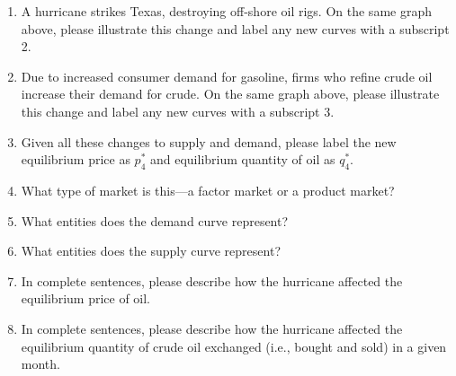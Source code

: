 \documentclass[
    letterpaper,paper=portrait,fleqn,
    DIV=16,fontsize=12pt,twoside=semi,
    parskip=full-,
    headings=standardclasses]
{scrartcl}
\begin{document}
\begin{enumerate}[resume]

\item A hurricane strikes Texas, destroying off-shore oil rigs. On the same graph above, please illustrate this change and label any new curves with a subscript 2.

\item Due to increased consumer demand for gasoline, firms who refine crude oil increase their demand for crude. On the same graph above, please illustrate this change and label any new curves with a subscript 3.

\item Given all these changes to supply and demand, please label the new equilibrium price as $p^*_4$
and equilibrium quantity of oil as $q^*_4$.

\item What type of market is this---a factor market or a product market?

\vfill

\vspace{-2\baselineskip}

\clearpage

\item What entities does the demand curve represent?

\vfill

\item What entities does the supply curve represent?

\vfill

\item In complete sentences, please describe how the hurricane affected the equilibrium price of oil.

\vfill

\item In complete sentences, please describe how the hurricane affected the equilibrium quantity of crude oil exchanged (i.e., bought and sold) in a given month.

\vfill

\end{enumerate}

\clearpage
\end{document}
